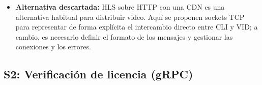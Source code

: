 \begin{itemize}
\begin{itemize}
        \item \textit{Si no responde:}
        Si un nodo falla (F3), el reproductor espera hasta el tiempo límite configurado e intenta solicitar el segmento a otro nodo disponible. Si tampoco lo obtiene, puede producirse una interrupción.

        \item \textit{Consistencia:}
        El contenido, número y versión identifican cada segmento. En una transmisión en vivo, los nodos pueden recibirlo en momentos distintos; por eso, el reproductor debe recibir la versión correspondiente a la secuencia que está reproduciendo.
    \end{itemize}

    \item \textbf{Alternativa descartada:}
    HLS sobre HTTP con una CDN es una alternativa habitual para distribuir video. Aquí se proponen sockets TCP para representar de forma explícita el intercambio directo entre CLI y VID; a cambio, es necesario definir el formato de los mensajes y gestionar las conexiones y los errores.

\end{itemize}

\subsection{S2: Verificación de licencia (gRPC)}
\label{sub:s2}

